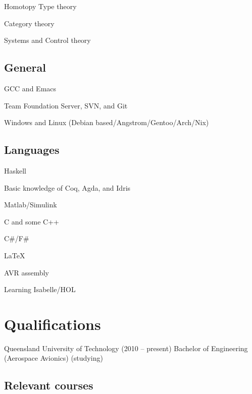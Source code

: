 \documentclass[letterpaper]{article}
\renewenvironment{itemize}{
  \begin{list}{}{
    \setlength{\leftmargin}{1.5em}
  }
}{
  \end{list}
}
\begin{document}
\begin{itemize}
\item Homotopy Type theory
\item Category theory
\item Systems and Control theory
\end{itemize}

\subsection*{General}

\begin{itemize}
\item GCC and Emacs
\item Team Foundation Server, SVN, and Git
\item Windows and Linux (Debian based/Angstrom/Gentoo/Arch/Nix)
\end{itemize}

\subsection*{Languages}

\begin{itemize}
\item Haskell
\item Basic knowledge of Coq, Agda, and Idris
\item Matlab/Simulink
\item C and some C++
\item C\#/F\#
\item LaTeX
\item AVR assembly
\item Learning Isabelle/HOL
\end{itemize}

\section*{Qualifications}

Queensland University of Technology (2010 – present)
Bachelor of Engineering (Aerospace Avionics) (studying)

\subsection*{Relevant courses}
\end{document}
